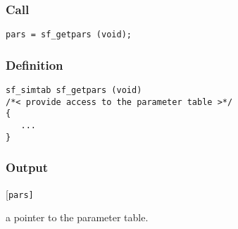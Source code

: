 \subsubsection*{Call}
\begin{verbatim}pars = sf_getpars (void);\end{verbatim}

\subsubsection*{Definition}
\begin{verbatim}
sf_simtab sf_getpars (void)
/*< provide access to the parameter table >*/
{
   ...
}
\end{verbatim}

\subsubsection*{Output}
\begin{desclist}{\tt }{\quad}[\tt pars]
   \setlength\itemsep{0pt}
   \item[pars] a pointer to the parameter table. 
\end{desclist}



